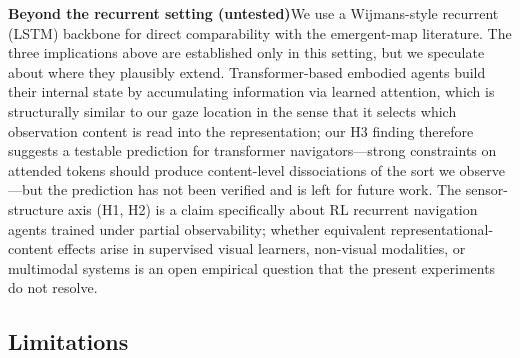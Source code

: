 \documentclass{article}
\begin{document}
\noindent\textbf{Beyond the recurrent setting (untested)}\quad We use a Wijmans-style recurrent (LSTM) backbone for direct comparability with the emergent-map literature. The three implications above are established only in this setting, but we speculate about where they plausibly extend. Transformer-based embodied agents build their internal state by accumulating information via learned attention, which is structurally similar to our gaze location in the sense that it selects which observation content is read into the representation; our H3 finding therefore suggests a testable prediction for transformer navigators---strong constraints on attended tokens should produce content-level dissociations of the sort we observe---but the prediction has not been verified and is left for future work. The sensor-structure axis (H1, H2) is a claim specifically about RL recurrent navigation agents trained under partial observability; whether equivalent representational-content effects arise in supervised visual learners, non-visual modalities, or multimodal systems is an open empirical question that the present experiments do not resolve.

\subsection{Limitations}
\label{sec:limitations}
\end{document}
